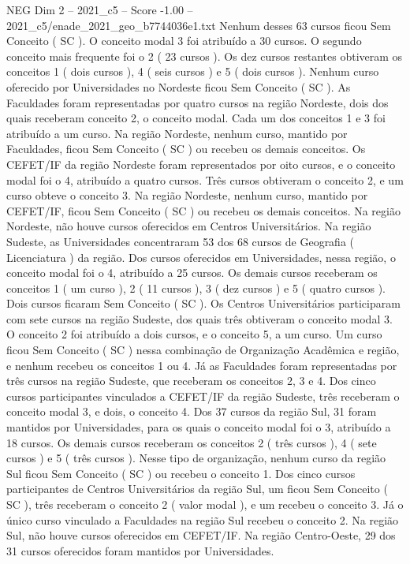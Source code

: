 \begin{textsample}{NEG Dim 2 – 2021\_c5 – Score -1.00 – 2021\_c5/enade\_2021\_geo\_b7744036e1.txt}
Nenhum desses 63 cursos ficou Sem Conceito ( SC ).
O conceito modal 3 foi atribuído a 30 cursos.
O segundo conceito mais frequente foi o 2 ( 23 cursos ).
Os dez cursos restantes obtiveram os conceitos 1 ( dois cursos ), 4 ( seis cursos ) e 5 ( dois cursos ).
Nenhum curso oferecido por Universidades no Nordeste ficou Sem Conceito ( SC ).
As Faculdades foram representadas por quatro cursos na região Nordeste, dois dos quais receberam conceito 2, o conceito modal.
Cada um dos conceitos 1 e 3 foi atribuído a um curso.
Na região Nordeste, nenhum curso, mantido por Faculdades, ficou Sem Conceito ( SC ) ou recebeu os demais conceitos.
Os CEFET/IF da região Nordeste foram representados por oito cursos, e o conceito modal foi o 4, atribuído a quatro cursos.
Três cursos obtiveram o conceito 2, e um curso obteve o conceito 3.
Na região Nordeste, nenhum curso, mantido por CEFET/IF, ficou Sem Conceito ( SC ) ou recebeu os demais conceitos.
Na região Nordeste, não houve cursos oferecidos em Centros Universitários.
Na região Sudeste, as Universidades concentraram 53 dos 68 cursos de Geografia ( Licenciatura ) da região.
Dos cursos oferecidos em Universidades, nessa região, o conceito modal foi o 4, atribuído a 25 cursos.
Os demais cursos receberam os conceitos 1 ( um curso ), 2 ( 11 cursos ), 3 ( dez cursos ) e 5 ( quatro cursos ).
Dois cursos ficaram Sem Conceito ( SC ).
Os Centros Universitários participaram com sete cursos na região Sudeste, dos quais três obtiveram o conceito modal 3.
O conceito 2 foi atribuído a dois cursos, e o conceito 5, a um curso.
Um curso ficou Sem Conceito ( SC ) nessa combinação de Organização Acadêmica e região, e nenhum recebeu os conceitos 1 ou 4.
Já as Faculdades foram representadas por três cursos na região Sudeste, que receberam os conceitos 2, 3 e 4.
Dos cinco cursos participantes vinculados a CEFET/IF da região Sudeste, três receberam o conceito modal 3, e dois, o conceito 4.
Dos 37 cursos da região Sul, 31 foram mantidos por Universidades, para os quais o conceito modal foi o 3, atribuído a 18 cursos.
Os demais cursos receberam os conceitos 2 ( três cursos ), 4 ( sete cursos ) e 5 ( três cursos ).
Nesse tipo de organização, nenhum curso da região Sul ficou Sem Conceito ( SC ) ou recebeu o conceito 1.
Dos cinco cursos participantes de Centros Universitários da região Sul, um ficou Sem Conceito ( SC ), três receberam o conceito 2 ( valor modal ), e um recebeu o conceito 3.
Já o único curso vinculado a Faculdades na região Sul recebeu o conceito 2.
Na região Sul, não houve cursos oferecidos em CEFET/IF.
Na região Centro-Oeste, 29 dos 31 cursos oferecidos foram mantidos por Universidades.

\end{textsample}
